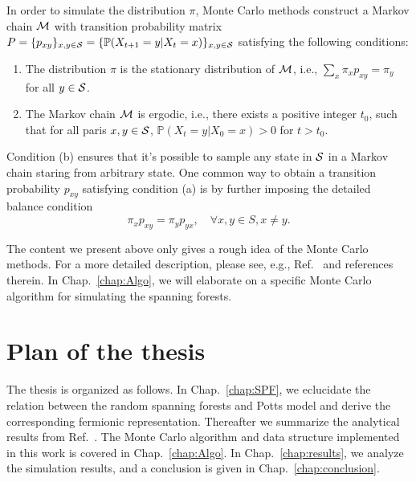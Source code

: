 In order to simulate the distribution $\pi$, Monte Carlo methods construct a Markov chain ${\mathcal M}$ with transition probability matrix 
$P = \{p_{xy}\}_{x, y\in {\mathcal S}} = \{\mathbb{P}(X_{t+1} = y|X_{t} = x)\}_{x, y\in {\mathcal S}}$ satisfying the following conditions:
\begin{enumerate}[label=(\alph*)]
	\item The distribution $\pi$ is the stationary distribution of ${\mathcal M}$, i.e.,  $\sum_x \pi_x p_{xy} = \pi_y$ for all $y\in {\mathcal S}$.
	\item The Markov chain ${\mathcal M}$ is ergodic, i.e., there exists a positive integer $t_0$, such that for all paris $x, y \in {\mathcal S}$, 
	$\mathbb{P}(X_t = y|X_0 = x) > 0$ for $t > t_0$.
\end{enumerate}
Condition (b) ensures that it's possible to sample any state in ${\mathcal S}$ in a Markov chain staring from arbitrary state.
One common way to obtain a transition probability $p_{xy}$ satisfying condition (a) is by further imposing the detailed balance condition
\begin{equation}
	\pi_x p_{xy} = \pi_y p_{yx}, \quad \forall x, y \in S, x\neq y.
\end{equation}

The content we present above only gives a rough idea of the Monte Carlo methods. For a more detailed description, please see, e.g., Ref.~ and references therein.
In Chap.~\ref{chap:Algo}, we will elaborate on a specific Monte Carlo algorithm for simulating the spanning forests.

\section{Plan of the thesis}
The thesis is organized as follows. In Chap.~\ref{chap:SPF}, we eclucidate the relation between the random spanning forests and
Potts model and derive the corresponding fermionic representation. Thereafter we summarize the analytical results from Ref.~.
The Monte Carlo algorithm and data structure implemented in this work is covered in Chap.~\ref{chap:Algo}. In Chap.~\ref{chap:results}, we analyze the simulation results, and a conclusion is given in Chap.~\ref{chap:conclusion}.



